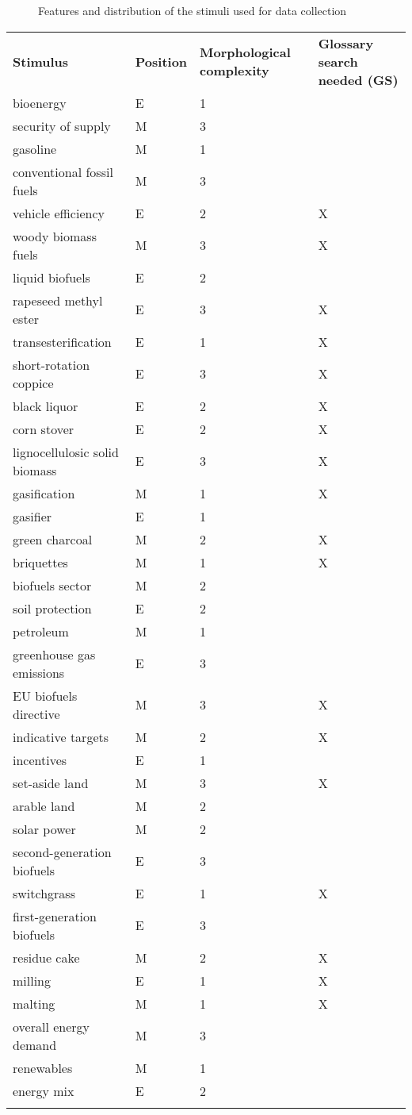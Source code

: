 \documentclass[output=paper]{langsci/langscibook}
\begin{document}
\begin{styleFramecontents}\begin{figure}
\caption{Features and distribution of the stimuli used for data collection}
\label{fig:key:8}
\end{figure}\end{styleFramecontents}

 

\begin{tabularx}{\textwidth}{XXXX}
\lsptoprule
\textbf{Stimulus} & \textbf{Position} & \textbf{Morphological complexity} & \textbf{Glossary search needed (GS)}\\
bioenergy & E & 1 & \\
security of supply & M & 3 & \\
gasoline & M & 1 & \\
conventional fossil fuels & M & 3 & \\
vehicle efficiency & E & 2 & X\\
woody biomass fuels & M & 3 & X\\
liquid biofuels & E & 2 & \\
rapeseed methyl ester & E & 3 & X\\
transesterification & E & 1 & X\\
short-rotation coppice & E & 3 & X\\
black liquor & E & 2 & X\\
corn stover & E & 2 & X\\
lignocellulosic solid biomass & E & 3 & X\\
gasification & M & 1 & X\\
gasifier & E & 1 & \\
green charcoal & M & 2 & X\\
briquettes & M & 1 & X\\
biofuels sector & M & 2 & \\
soil protection & E & 2 & \\
petroleum & M & 1 & \\
greenhouse gas emissions & E & 3 & \\
EU biofuels directive & M & 3 & X\\
indicative targets & M & 2 & X\\
incentives & E & 1 & \\
set-aside land & M & 3 & X\\
arable land & M & 2 & \\
solar power & M & 2 & \\
second-generation biofuels & E & 3 & \\
switchgrass & E & 1 & X\\
first-generation biofuels & E & 3 & \\
residue cake & M & 2 & X\\
milling & E & 1 & X\\
malting & M & 1 & X\\
overall energy demand & M & 3 & \\
renewables & M & 1 & \\
energy mix & E & 2 & \\
\lspbottomrule
\end{tabularx}
\end{document}
